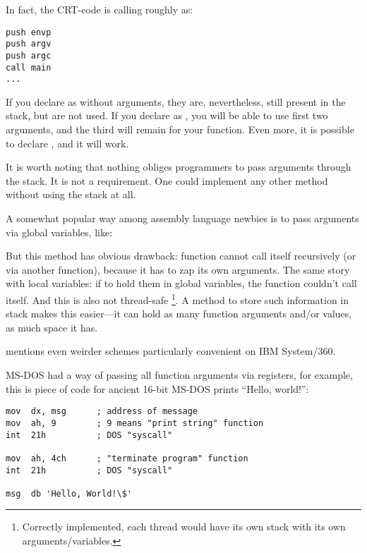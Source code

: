In fact, the \ac{CRT}-code is calling \main roughly as:
	
\begin{lstlisting}[style=customasmx86]
push envp
push argv
push argc
call main
...
\end{lstlisting}

If you declare \main as \main without arguments, they are, nevertheless, still present in the stack, but are not used.
If you declare \main as  ,
you will be able to use first two arguments, and the third will remain  for your function.
Even more, it is possible to declare , and it will work.


It is worth noting that nothing obliges programmers to pass arguments through the stack. It is not a requirement.
One could implement any other method without using the stack at all.

A somewhat popular way among assembly language newbies is to pass arguments via global variables, like:



But this method has obvious drawback:  function cannot call itself recursively (or via another function),
because it has to zap its own arguments.
The same story with local variables: if to hold them in global variables, the function couldn't call itself.
And this is also not thread-safe
\footnote{Correctly implemented, each thread would have its own stack with its own arguments/variables.}.
A method to store such information in stack makes this easier---it can hold as many function arguments and/or values,
as much space it has.

 mentions even weirder schemes particularly convenient on IBM System/360.


MS-DOS had a way of passing all function arguments via registers, for example, this is piece of
code for ancient 16-bit MS-DOS prints ``Hello, world!'':

\begin{lstlisting}[style=customasmx86]
mov  dx, msg      ; address of message
mov  ah, 9        ; 9 means "print string" function
int  21h          ; DOS "syscall"

mov  ah, 4ch      ; "terminate program" function
int  21h          ; DOS "syscall"

msg  db 'Hello, World!\$'
\end{lstlisting}

